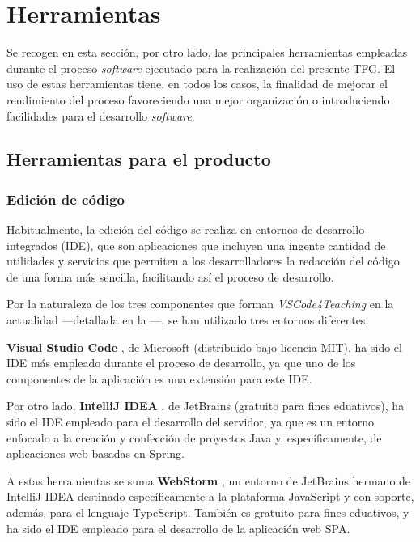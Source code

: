 \section{Herramientas}
\label{sec:herramientas}

Se recogen en esta sección, por otro lado, las principales herramientas empleadas durante el proceso \textit{software} ejecutado para la realización del presente TFG. El uso de estas herramientas tiene, en todos los casos, la finalidad de mejorar el rendimiento del proceso favoreciendo una mejor organización o introduciendo facilidades para el desarrollo \textit{software}.

\subsection{Herramientas para el producto}
\subsubsection{Edición de código}
\label{subsec:edicionCodigo}
Habitualmente, la edición del código se realiza en entornos de desarrollo integrados (IDE), que son aplicaciones que incluyen una ingente cantidad de utilidades y servicios que permiten a los desarrolladores la redacción del código de una forma más sencilla, facilitando así el proceso de desarrollo.

Por la naturaleza de los tres componentes que forman \textit{VSCode4Teaching} en la actualidad ---detallada en la ---, se han utilizado tres entornos diferentes.

\textbf{Visual Studio Code} \cite{Her_VSCode}, de Microsoft (distribuido bajo licencia MIT), ha sido el IDE más empleado durante el proceso de desarrollo, ya que uno de los componentes de la aplicación es una extensión para este IDE.

Por otro lado, \textbf{IntelliJ IDEA} \cite{Her_IntelliJ}, de JetBrains (gratuito para fines eduativos), ha sido el IDE empleado para el desarrollo del servidor, ya que es un entorno enfocado a la creación y confección de proyectos Java y, específicamente, de aplicaciones web basadas en Spring.

A estas herramientas se suma \textbf{WebStorm} \cite{Her_WebStorm}, un entorno de JetBrains hermano de IntelliJ IDEA destinado específicamente a la plataforma JavaScript y con soporte, además, para el lenguaje TypeScript. También es gratuito para fines eduativos, y ha sido el IDE empleado para el desarrollo de la aplicación web SPA.

